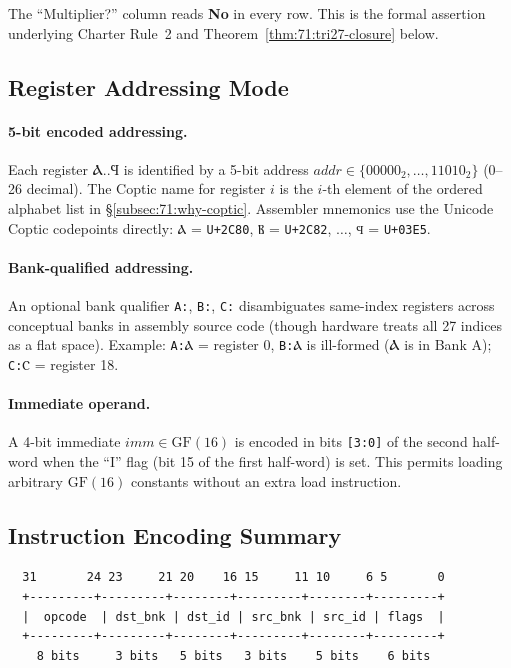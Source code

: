 The ``Multiplier?'' column reads \textbf{No} in every row.  This is
the formal assertion underlying Charter Rule~2 and
Theorem~\ref{thm:71:tri27-closure} below.

\subsection{Register Addressing Mode}
\label{subsec:71:addr-mode}

\paragraph{5-bit encoded addressing.}
Each register Ⲁ..Ϥ is identified by a 5-bit address
$\mathit{addr} \in \{00000_2, \ldots, 11010_2\}$ (0--26 decimal).
The Coptic name for register $i$ is the $i$-th element of the ordered
alphabet list in \S\ref{subsec:71:why-coptic}.  Assembler mnemonics
use the Unicode Coptic codepoints directly: \texttt{Ⲁ} = \texttt{U+2C80},
\texttt{Ⲃ} = \texttt{U+2C82}, $\ldots$, \texttt{Ϥ} = \texttt{U+03E5}.

\paragraph{Bank-qualified addressing.}
An optional bank qualifier \texttt{A:}, \texttt{B:}, \texttt{C:}
disambiguates same-index registers across conceptual banks in
assembly source code (though hardware treats all 27 indices as a flat
space).  Example: \texttt{A:Ⲁ} = register 0, \texttt{B:Ⲁ} is ill-formed
(Ⲁ is in Bank A); \texttt{C:Ⲥ} = register 18.

\paragraph{Immediate operand.}
A 4-bit immediate $\mathit{imm} \in \mathrm{GF}(16)$ is encoded in bits
\texttt{[3:0]} of the second half-word when the ``I'' flag (bit 15 of
the first half-word) is set.  This permits loading arbitrary
$\mathrm{GF}(16)$ constants without an extra load instruction.

\subsection{Instruction Encoding Summary}
\label{subsec:71:instr-encoding}

\begin{verbatim}
  31       24 23     21 20    16 15     11 10     6 5       0
  +---------+---------+--------+---------+--------+---------+
  |  opcode  | dst_bnk | dst_id | src_bnk | src_id | flags  |
  +---------+---------+--------+---------+--------+---------+
    8 bits     3 bits   5 bits   3 bits    5 bits    6 bits
\end{verbatim}

